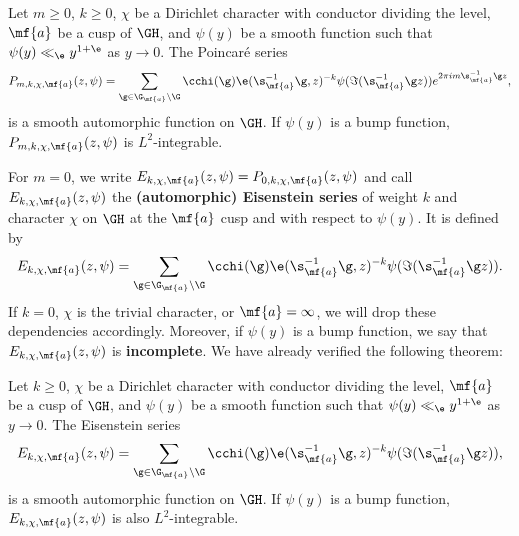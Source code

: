     \begin{theorem}
      Let $m \ge 0$, $k \ge 0$, $\chi$ be a Dirichlet character with conductor dividing the level, $\mf{a}$ be a cusp of $\GH$, and $\psi(y)$ be a smooth function such that $\psi(y) \ll_{\e} y^{1+\e}$ as $y \to 0$. The Poincar\'e series
      \[
        P_{m,k,\chi,\mf{a}}(z,\psi) = \sum_{\g \in \G_{\mf{a}}\backslash\G}\cchi(\g)\e(\s_{\mf{a}}^{-1}\g,z)^{-k}\psi(\Im(\s_{\mf{a}}^{-1}\g z))e^{2\pi im\s_{\mf{a}}^{-1}\g z},
      \]
      is a smooth automorphic function on $\GH$. If $\psi(y)$ is a bump function, $P_{m,k,\chi,\mf{a}}(z,\psi)$ is $L^{2}$-integrable.
    \end{theorem}
    
    For $m = 0$, we write $E_{k,\chi,\mf{a}}(z,\psi) = P_{0,k,\chi,\mf{a}}(z,\psi)$ and call $E_{k,\chi,\mf{a}}(z,\psi)$ the \textbf{(automorphic) Eisenstein series} of weight $k$ and character $\chi$ on $\GH$ at the $\mf{a}$ cusp and with respect to $\psi(y)$. It is defined by
    \[
      E_{k,\chi,\mf{a}}(z,\psi) = \sum_{\g \in \G_{\mf{a}}\backslash\G}\cchi(\g)\e(\s_{\mf{a}}^{-1}\g,z)^{-k}\psi(\Im(\s_{\mf{a}}^{-1}\g z)).
    \]
    If $k = 0$, $\chi$ is the trivial character, or $\mf{a} = \infty$, we will drop these dependencies accordingly. Moreover, if $\psi(y)$ is a bump function, we say that $E_{k,\chi,\mf{a}}(z,\psi)$ is \textbf{incomplete}. We have already verified the following theorem:
  
    \begin{theorem}
      Let $k \ge 0$, $\chi$ be a Dirichlet character with conductor dividing the level, $\mf{a}$ be a cusp of $\GH$, and $\psi(y)$ be a smooth function such that $\psi(y) \ll_{\e} y^{1+\e}$ as $y \to 0$. The Eisenstein series
      \[
        E_{k,\chi,\mf{a}}(z,\psi) = \sum_{\g \in \G_{\mf{a}}\backslash\G}\cchi(\g)\e(\s_{\mf{a}}^{-1}\g,z)^{-k}\psi(\Im(\s_{\mf{a}}^{-1}\g z)),
      \]
      is a smooth automorphic function on $\GH$. If $\psi(y)$ is a bump function, $E_{k,\chi,\mf{a}}(z,\psi)$ is also $L^{2}$-integrable.
    \end{theorem}
    
